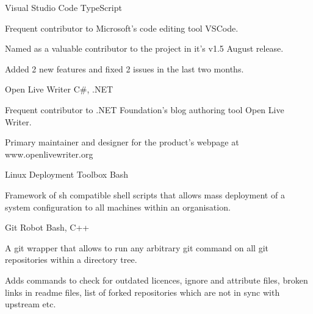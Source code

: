 
\begin{projentries}

\projentry%
  {Visual Studio Code} %
  {TypeScript} %
  {} %
  {%
    \begin{projitems} %
      \item{Frequent contributor to Microsoft's code editing tool VSCode.}
      \item{Named as a valuable contributor to the project in it's v1.5 August
            release.}
      \item{Added 2 new features and fixed 2 issues in the last two months.}
    \end{projitems}
  }

\projentry%
  {Open Live Writer} %
  {C\#, .NET} %
  {} %
  {%
    \begin{projitems} %
      \item{Frequent contributor to .NET Foundation’s blog authoring tool Open
            Live Writer.}
      \item{Primary maintainer and designer for the product's webpage at
            www.openlivewriter.org}
    \end{projitems}
  }

\projentry%
  {Linux Deployment Toolbox} %
  {Bash} %
  {} %
  {%
    \begin{projitems} %
    \item{Framework of sh compatible shell scripts that allows mass deployment
          of a system configuration to all machines within an organisation.}
    \end{projitems}
  }

\projentry%
  {Git Robot} %
  {Bash, C++} %
  {} %
  {%
    \begin{projitems} %
      \item{A git wrapper that allows to run any arbitrary git command on all
            git repositories within a directory tree.}
      \item{Adds commands to check for outdated licences, ignore and
            attribute files, broken links in readme files, list of forked
            repositories which are not in sync with upstream etc.}
    \end{projitems}
  }


\end{projentries}
